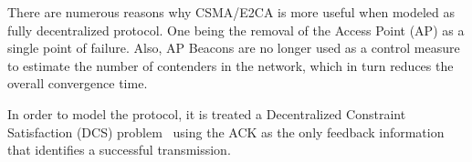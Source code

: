 There are numerous reasons why CSMA/E2CA is more useful when modeled as fully decentralized protocol. One being the removal of the Access Point (AP) as a single point of failure. Also, AP Beacons are no longer used as a control measure to estimate the number of contenders in the network, which in turn reduces the overall convergence time.

In order to model the protocol, it is treated a Decentralized Constraint Satisfaction (DCS) problem~\cite{DCSP, DCSP-E2CA} using the ACK as the only feedback information that identifies a successful transmission.
